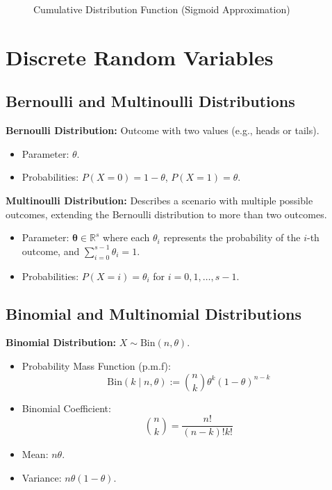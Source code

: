 \begin{figure}[H]
    \centering
    \caption{Cumulative Distribution Function (Sigmoid Approximation)}
\end{figure}


\section{Discrete Random Variables}


\subsection{Bernoulli and Multinoulli Distributions}
\textbf{Bernoulli Distribution:} Outcome with two values (e.g., heads or tails).
\begin{itemize}
    \item Parameter: \(\theta\).
    \item Probabilities: \(P(X = 0) = 1 - \theta\), \(P(X = 1) = \theta\).
\end{itemize}

\textbf{Multinoulli Distribution:} Describes a scenario with multiple possible outcomes, extending the Bernoulli distribution to more than two outcomes.
\begin{itemize}
    \item Parameter: \(\bm{\theta} \in \mathbb{R}^s\) where each \(\theta_i\) represents the probability of the \(i\)-th outcome, and \(\sum_{i=0}^{s-1} \theta_i = 1\).
    \item Probabilities: \(P(X = i) = \theta_i\) for \(i = 0, 1, \ldots, s-1\).
\end{itemize}

\subsection{Binomial and Multinomial Distributions}
\textbf{Binomial Distribution:} \(X \sim \text{Bin}(n, \theta)\).
\begin{itemize}
    \item Probability Mass Function (p.m.f):
    \[
    \text{Bin}(k \mid n, \theta) := \binom{n}{k} \theta^k (1 - \theta)^{n-k}
    \]
    \item Binomial Coefficient:
    \[
    \binom{n}{k} = \frac{n!}{(n - k)!k!}
    \]
    \item Mean: \(n\theta\).
    \item Variance: \(n\theta(1 - \theta)\).
\end{itemize}

